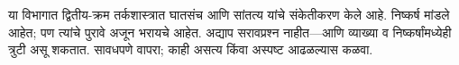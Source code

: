 \documentclass[../../../include/open-logic-chapter]{subfiles}
\begin{document}

\begin{editorial}
या विभागात द्वितीय-क्रम तर्कशास्त्रात घातसंच आणि
सांतत्य यांचे संकेतीकरण केले आहे. निष्कर्ष मांडले
आहेत; पण त्यांचे पुरावे अजून भरायचे आहेत. अद्याप
सरावप्रश्न नाहीत---आणि व्याख्या व निष्कर्षांमध्येही
त्रुटी असू शकतात. सावधपणे वापरा; काही असत्य
किंवा अस्पष्ट आढळल्यास कळवा.
\end{editorial}





\OLEndChapterHook
\end{document}
